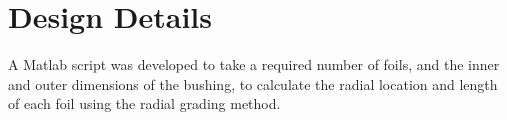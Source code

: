 \section{Design Details}
A Matlab script was developed to take a required number of foils, and the inner and outer dimensions of the bushing, to calculate the radial location and length of each foil using the radial grading method.

